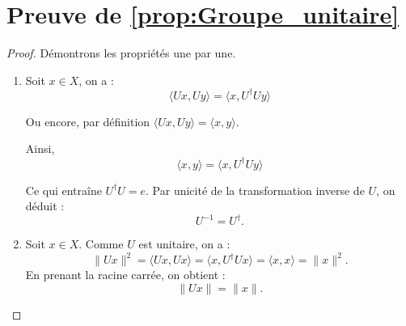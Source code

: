 \documentclass[a4paper,10pt]{article}
\theoremstyle{definition} %
\theoremstyle{definition} %
\theoremstyle{definition} %
\theoremstyle{definition} %
\newcommand{\E}[1]{\mathbb{E}\left[#1\right]}
\newcommand{\R}{\mathbb{R}}
\begin{document}
    

\section{Preuve de \cref{prop:Groupe_unitaire}}\label{sec:proof_groupe_unitaire}
\begin{proof}
    Démontrons les propriétés une par une.

    \begin{enumerate}[label=(\roman*)]
        \item Soit $x \in X$, on a :
        \begin{equation*}
            \langle Ux, U y \rangle = \langle x, U^\dagger U y \rangle
        \end{equation*}
        
        Ou encore, par définition $\langle Ux, U y \rangle= \langle x, y \rangle $.

        Ainsi,
        \begin{equation*}
            \langle x, y \rangle = \langle x, U^\dagger U y \rangle
        \end{equation*}

        Ce qui entraîne $U^\dagger U = e$. Par unicité de la transformation inverse de $U$, on déduit :
        \[
        U^{-1} = U^\dagger.
        \]
        \item Soit \( x \in X \). Comme \( U \) est unitaire, on a :
        \[
        \|Ux\|^2 = \langle Ux, Ux \rangle = \langle x, U^\dagger U x \rangle = \langle x, x \rangle = \|x\|^2.
        \]
        En prenant la racine carrée, on obtient :
        \[
        \|Ux\| = \|x\|.
        \]


\end{enumerate}
\end{proof}
\end{document}
